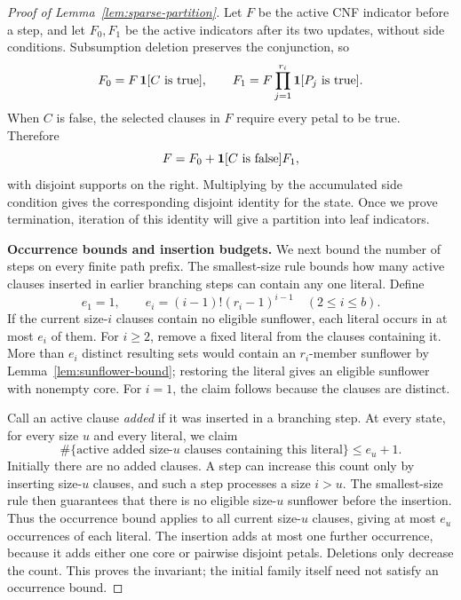 \begin{proof}[Proof of Lemma~\ref{lem:sparse-partition}]
Let $F$ be the active CNF indicator before a step, and let $F_0,F_1$ be
the active indicators after its two updates, without side conditions.
Subsumption deletion preserves the conjunction, so
\[
 F_0=F\,\mathbf 1[C\text{ is true}],\qquad
 F_1=F\prod_{j=1}^{r_i}\mathbf 1[P_j\text{ is true}].
\]
When $C$ is false, the selected clauses in $F$ require every petal to be
true.  Therefore
\begin{equation}\label{eq:sparse-branch-identity}
 F=F_0+\mathbf 1[C\text{ is false}]F_1,
\end{equation}
with disjoint supports on the right.  Multiplying by the accumulated
side condition gives the corresponding disjoint identity for the state.
Once we prove termination, iteration of this identity will give a
partition into leaf indicators.

\medskip\noindent
\textbf{Occurrence bounds and insertion budgets.}
We next bound the number of steps on every finite path prefix.  The
smallest-size rule bounds how many active clauses inserted in earlier
branching steps can contain any one literal.  Define
\[
 e_1=1,\qquad e_i=(i-1)!(r_i-1)^{i-1}\quad(2\le i\le b).
\]
If the current size-$i$ clauses contain no eligible sunflower, each
literal occurs in at most $e_i$ of them.  For $i\ge2$, remove a fixed
literal from the clauses containing it.  More than $e_i$ distinct
resulting sets would contain an $r_i$-member sunflower by
Lemma~\ref{lem:sunflower-bound}; restoring the literal gives an eligible
sunflower with nonempty core.  For $i=1$, the claim follows because the
clauses are distinct.

Call an active clause \emph{added} if it was inserted in a branching step.
At every state, for every size $u$ and every literal, we claim
\begin{equation}\label{eq:sparse-added-invariant}
 \#\{\text{active added size-$u$ clauses containing this literal}\}
 \le e_u+1.
\end{equation}
Initially there are no added clauses.  A step can increase this count
only by inserting size-$u$ clauses, and such a step processes a size
$i>u$.  The smallest-size rule then guarantees that there is no eligible
size-$u$ sunflower before the insertion.  Thus the occurrence bound
applies to all current size-$u$ clauses, giving at most $e_u$ occurrences
of each literal.  The insertion adds at most one further occurrence,
because it adds either one core or pairwise disjoint petals.  Deletions
only decrease the count.  This proves the invariant; the initial family
itself need not satisfy an occurrence bound.


\end{proof}
